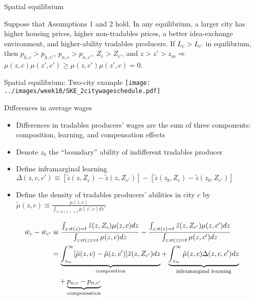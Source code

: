 \documentclass[10pt,notes=hide]{beamer}
\begin{document}
\begin{frame}{Spatial equilibrium}
\begin{proposition} \label{prop:crosscitycharacteristics}
Suppose that Assumptions 1 and 2 hold. In any equilibrium, a larger city has higher housing prices, higher non-tradables prices, a better idea-exchange environment, and higher-ability tradables producers. If $L_c > L_{c'}$ in equilibrium, then $p_{h,c}>p_{h,c'}$, $p_{n,c}>p_{n,c'}$, $Z_c>Z_{c'}$, and $z>z'>z_m \Rightarrow$ $\mu(z,c)\mu(z',c')\geq\mu(z,c')\mu(z',c)=0$.
\end{proposition}
\end{frame}
\begin{frame}{Spatial equilibrium: Two-city example}
\texttt{[image: ../images/week10/SKE\_2citywageschedule.pdf]}
\end{frame}
\begin{frame}{Differences in average wages}
\begin{itemize}
	\item Differences in tradables producers' wages are the sum of three components: composition, learning, and compensation effects
	\item Denote $z_b$ the ``boundary'' ability of indifferent tradables producer
	\item Define inframarginal learning $\Delta(z,c,c')\equiv\left[\tilde{z}(z,Z_{c})-\tilde{z}(z,Z_{c'})\right]-\left[\tilde{z}(z_{b},Z_{c})-\tilde{z}(z_{b},Z_{c'})\right]$
	\item Define the density of tradables producers' abilities in city $c$ by $\tilde{\mu}(z,c)\equiv\frac{\mu(z,c)}{\int_{z':\sigma(z')=t}\mu(z',c)dz'}$
\end{itemize}
\begin{align*}%
\bar{w}_{c}-\bar{w}_{c'} &\equiv \frac{\int_{z:\sigma(z)=t}\tilde{z}(z,Z_{c})\mu(z,c)dz}{\int_{z:\sigma(z)=t}\mu(z,c)dz}-\frac{\int_{z:\sigma(z)=t}\tilde{z}(z,Z_{c'})\mu(z,c')dz}{\int_{z:\sigma(z)=t}\mu(z,c')dz} \\
& =\underbrace{\int_{z_m}^{\infty}[\tilde{\mu}(z,c)-\tilde{\mu}(z,c')]\tilde{z}(z,Z_{c'})dz}_{\textnormal{composition}} + \underbrace{\int_{z_m}^{\infty}\tilde{\mu}(z,c)\Delta(z,c,c')dz}_{\textnormal{inframarginal learning}} \\
&\quad +\underbrace{p_{n,c}-p_{n,c'}}_{\textnormal{compensation}}
\end{align*}
\end{frame}
\end{document}
